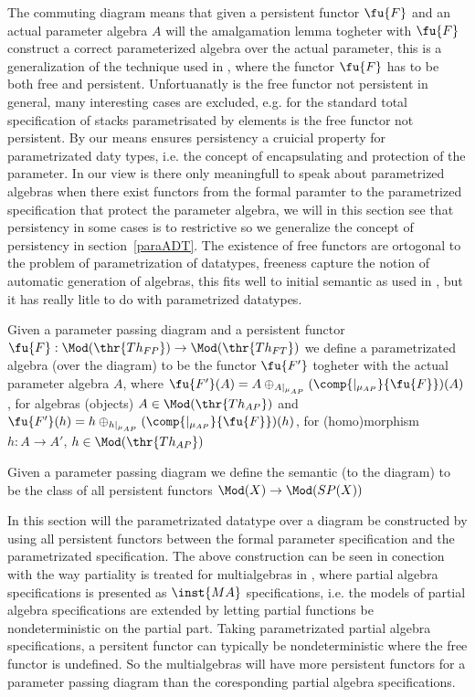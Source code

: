 The commuting diagram means that given a persistent functor $\fu{F}$ and an actual parameter algebra $A$ will the amalgamation lemma togheter with $\fu{F}$ construct a correct parameterized algebra over the actual parameter, this is a generalization of the technique used in \cite{Alge}, where the functor $\fu{F}$ has to be both free and persistent. Unfortuanatly is the free functor not persistent in general, many interesting cases are excluded, e.g. for the standard total specification of stacks parametrisated by elements is the free functor not persistent.
By our means ensures persistency a cruicial property for parametrizated daty types, i.e. the concept of encapsulating and protection of the parameter.
In our view is there only meaningfull to speak about parametrized algebras when there exist functors from the formal paramter to the parametrized specification that protect the parameter algebra, we will in this section see that persistency in some cases is to restrictive so we generalize the concept of persistency in section~\ref{paraADT}. The existence of free functors are ortogonal to the problem of parametrization of datatypes, freeness capture the notion of automatic generation of algebras, this fits well to initial semantic as used in \cite{Alge}, but it has really litle to do with parametrized datatypes.

\begin{definition}
Given a parameter passing diagram and a persistent functor $\fu{F}: \Mod(\thr{Th_{FP}}) \to \Mod(\thr{Th_{FT}})$ we define a parametrizated algebra (over the diagram) to be the functor $\fu{F'}$ togheter with the actual parameter algebra $A$, where $\fu{F'}(A) = A \oplus_{A |_{\mu_{AP}}} (\comp{|_{\mu_{AP}}}{\fu{F}}) (A)$, for algebras (objects) $A \in \Mod(\thr{Th_{AP}})$  and $\fu{F'}(h) = h \oplus_{h |_{\mu_{AP}}} (\comp{|_{\mu_{AP}}}{\fu{F}}) (h)$, for (homo)morphism $h:A \to A'$, $h \in \Mod(\thr{Th_{AP}})$
\end{definition}


\begin{definition}
Given a parameter passing diagram we define the semantic (to the diagram) to be the class of all persistent functors $\Mod(X) \to \Mod(SP(X))$
\end{definition}



In this section will the parametrizated datatype over a diagram be constructed by using all persistent functors between the formal parameter specification and the parametrizated specification. The above construction can be seen in conection with the way partiality is treated for multialgebras in \cite{partial}, where partial algebra specifications is presented as $\inst{MA}$ specifications, i.e. the models of partial algebra specifications are extended by letting partial functions be nondeterministic on the partial part. Taking parametrizated partial algebra specifications, a persitent functor can typically be nondeterministic where the free functor is undefined. So the multialgebras will have more persistent functors for a parameter passing diagram than the coresponding partial algebra specifications. 

